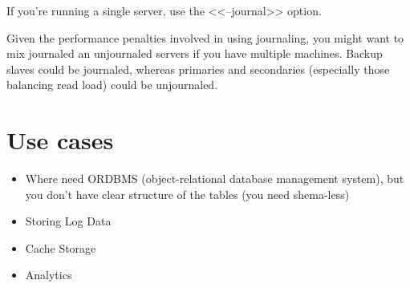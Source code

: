 If you’re running a single server, use the <<--journal>> option.

Given the performance penalties involved in using journaling, you might want to mix journaled an unjournaled servers if you have multiple machines. Backup slaves could be journaled, whereas primaries and secondaries (especially those balancing read load) could be unjournaled.\cite{mongodb_tips}

\section{Use cases}

\begin{itemize}
  \item Where need ORDBMS (object-relational database management system), but you don't have clear structure of the tables (you need shema-less)
  \item Storing Log Data
  \item Cache Storage
  \item Analytics
\end{itemize}